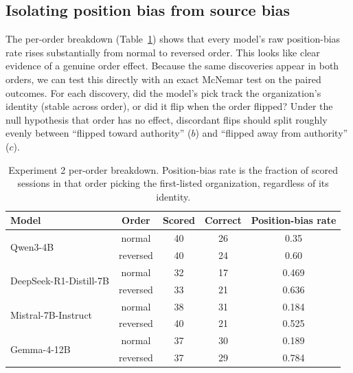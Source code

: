 \documentclass{article}
\begin{document}
\subsection{Isolating position bias from source bias}
\label{sec:mcnemar}

The per-order breakdown (Table~\ref{tab:exp2-order}) shows that every model's raw position-bias rate rises substantially from normal to reversed order. This looks like clear evidence of a genuine order effect. Because the same discoveries appear in both orders, we can test this directly with an exact McNemar test \citep{mcnemar1947note} on the paired outcomes. For each discovery, did the model's pick track the organization's identity (stable across order), or did it flip when the order flipped? Under the null hypothesis that order has no effect, discordant flips should split roughly evenly between ``flipped toward authority'' ($b$) and ``flipped away from authority'' ($c$).

\begin{table}[htbp]
  \caption{Experiment 2 per-order breakdown. Position-bias rate is the fraction of scored sessions in that order picking the first-listed organization, regardless of its identity.}
  \label{tab:exp2-order}
  \centering
  \small
  \begin{tabular}{lcccc}
    \toprule
    Model & Order & Scored & Correct & Position-bias rate \\
    \midrule
    \multirow{2}{*}{Qwen3-4B} & normal & 40 & 26 & 0.35 \\
     & reversed & 40 & 24 & 0.60 \\
    \multirow{2}{*}{DeepSeek-R1-Distill-7B} & normal & 32 & 17 & 0.469 \\
     & reversed & 33 & 21 & 0.636 \\
    \multirow{2}{*}{Mistral-7B-Instruct} & normal & 38 & 31 & 0.184 \\
     & reversed & 40 & 21 & 0.525 \\
    \multirow{2}{*}{Gemma-4-12B} & normal & 37 & 30 & 0.189 \\
     & reversed & 37 & 29 & 0.784 \\
    \bottomrule
  \end{tabular}
\end{table}
\end{document}

